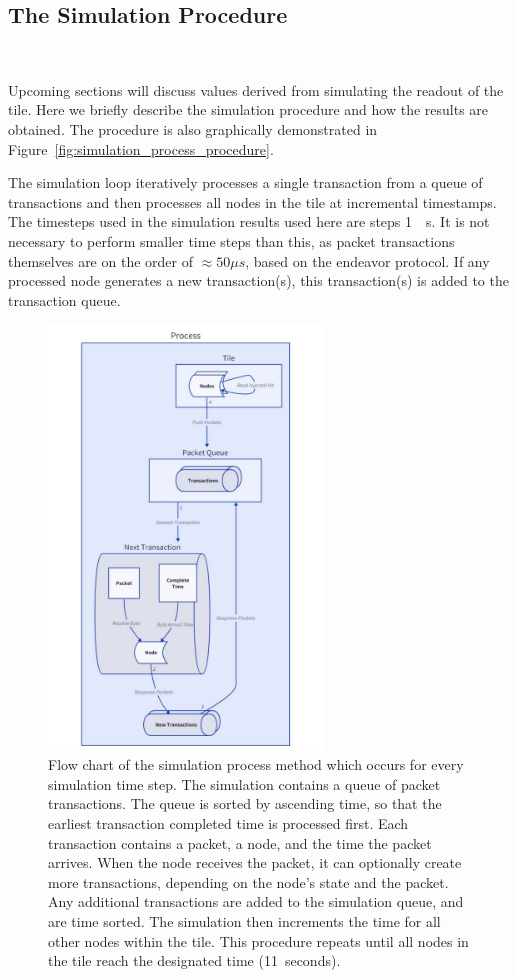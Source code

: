 \subsection{The Simulation Procedure}~\label{sec:process}

Upcoming sections will discuss values derived from simulating the readout of the tile. 
Here we briefly describe the simulation procedure and how the results are obtained.
The procedure is also graphically demonstrated in Figure~\ref{fig:simulation_process_procedure}.

The simulation loop iteratively processes a single transaction from a queue of transactions and then processes all nodes in the tile at incremental timestamps.
The timesteps used in the simulation results used here are steps 1~\unit{\mu s}.
It is not necessary to perform smaller time steps than this, as packet transactions themselves are on the order of $\approx 50 \unit{\mu s}$, based on the endeavor protocol.
If any processed node generates a new transaction(s), this transaction(s) is added to the transaction queue.

\begin{figure}[]
\centering
\includegraphics[width=0.65\textwidth]{images/simulation_process_method.pdf}
\caption{Flow chart of the simulation process method which occurs for every simulation time step.
The simulation contains a queue of packet transactions.
The queue is sorted by ascending time, so that the earliest transaction completed time is processed first.
Each transaction contains a packet, a node, and the time the packet arrives.
When the node receives the packet, it can optionally create more transactions, depending on the node's state and the packet.
Any additional transactions are added to the simulation queue, and are time sorted.
The simulation then increments the time for all other nodes within the tile.
This procedure repeats until all nodes in the tile reach the designated time (11~\unit{seconds}).
}
\end{figure}~\label{fig:simulation_process_procedure}

